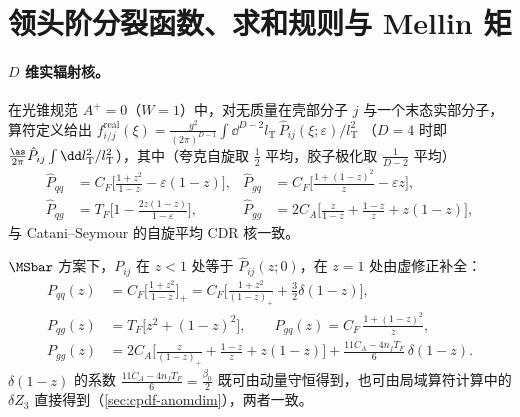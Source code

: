 \section{领头阶分裂函数、求和规则与 Mellin 矩}\label{sec:cpdf-split}

\paragraph{$D$ 维实辐射核。}
在光锥规范 $A^+=0$（$W=1$）中，对无质量在壳部分子 $j$ 与一个末态实部分子，算符定义给出
$f^{\mathrm{real}}_{i/j}(\xi)=\frac{g^2}{(2\pi)^{D-1}}\int\dd^{D-2}l_{\mathrm T}\,\hat P_{ij}(\xi;\varepsilon)/l_{\mathrm T}^2$
（$D=4$ 时即 $\frac{\as}{2\pi}\hat P_{ij}\int\dd l_{\mathrm T}^2/l_{\mathrm T}^2$），其中（夸克自旋取 $\frac12$ 平均，胶子极化取 $\frac1{D-2}$ 平均）
\begin{equation}\label{eq:cpdf-Phat}
\begin{aligned}
\hat P_{qq}&=C_F\Big[\frac{1+z^2}{1-z}-\varepsilon(1-z)\Big], &
\hat P_{gq}&=C_F\Big[\frac{1+(1-z)^2}{z}-\varepsilon z\Big],\\
\hat P_{qg}&=T_F\Big[1-\frac{2z(1-z)}{1-\varepsilon}\Big], &
\hat P_{gg}&=2C_A\Big[\frac{z}{1-z}+\frac{1-z}{z}+z(1-z)\Big],
\end{aligned}
\end{equation}
与 Catani--Seymour 的自旋平均 CDR 核一致。

\begin{theorem}[领头阶分裂函数]\tagR\label{thm:cpdf-split}
$\MSbar$ 方案下，$P_{ij}$ 在 $z<1$ 处等于 $\hat P_{ij}(z;0)$，在 $z=1$ 处由虚修正补全：
\begin{equation}\label{eq:cpdf-Pij}
\begin{aligned}
P_{qq}(z)&=C_F\Big[\frac{1+z^2}{1-z}\Big]_+=C_F\Big[\frac{1+z^2}{(1-z)_+}+\frac32\delta(1-z)\Big],\\
P_{qg}(z)&=T_F\big[z^2+(1-z)^2\big],\qquad P_{gq}(z)=C_F\,\frac{1+(1-z)^2}{z},\\
P_{gg}(z)&=2C_A\Big[\frac{z}{(1-z)_+}+\frac{1-z}{z}+z(1-z)\Big]+\frac{11C_A-4n_fT_F}{6}\,\delta(1-z).
\end{aligned}
\end{equation}
$\delta(1-z)$ 的系数 $\frac{11C_A-4n_fT_F}{6}=\frac{\beta_0}{2}$ 既可由动量守恒得到，也可由局域算符计算中的 $\delta Z_3$ 直接得到（\cref{sec:cpdf-anomdim}），两者一致。
\end{theorem}

